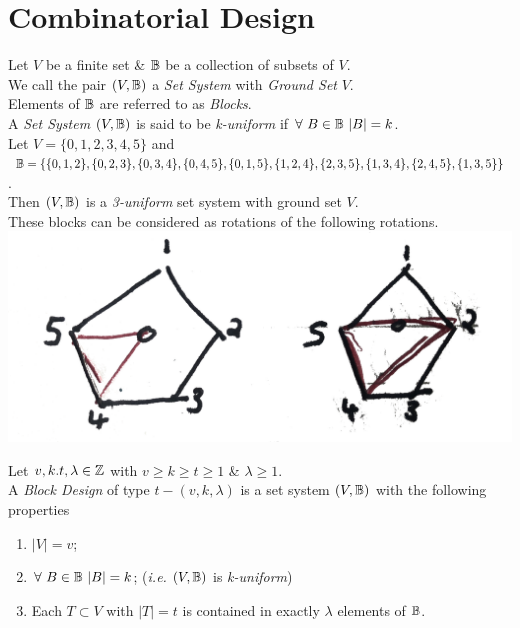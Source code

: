 \documentclass[11pt,a4paper]{article}
\begin{document}
\section{Combinatorial Design}

Let $V$ be a finite set \& $\mathbb{B}$ be a collection of subsets of $V$.\\
We call the pair $(V,\mathbb{B})$ a \textit{Set System} with \textit{Ground Set} $V$.\\
\nb Elements of $\mathbb{B}$ are referred to as \textit{Blocks}.\\

A \textit{Set System} $(V,\mathbb{B})$ is said to be \textit{k-uniform} if $\forall\ B\in\blocks\ |B|=k$.\\

Let $V=\{0,1,2,3,4,5\}$ and\\
$\mathbb{B}=\{\{0,1,2\},\{0,2,3\},\{0,3,4\},\{0,4,5\},\{0,1,5\},\{1,2,4\},\{2,3,5\},\{1,3,4\},\{2,4,5\},\{1,3,5\}\}$.\\
Then $(V,\mathbb{B})$ is a \textit{3-uniform} set system with ground set $V$.\\
These blocks can be considered as rotations of the following rotations.\\
\includegraphics[scale=1]{img/3Uniform.jpg}

Let $v,k.t,\lambda\in\mathbb{Z}$ with $v\geq k\geq t\geq 1$ \& $\lambda\geq1$.\\
A \textit{Block Design} of type $t-(v,k,\lambda)$ is a set system $(V,\mathbb{B})$ with the following properties
\begin{enumerate}[label=\roman*)]
	\item $|V|=v$;
	\item $\forall\ B\in\blocks\ |B|=k$; (\textit{i.e.} $(V,\mathbb{B})$ is \textit{k-uniform})
	\item Each $T\subset V$ with $|T|=t$ is contained in exactly $\lambda$ elements of $\mathbb{B}$.
\end{enumerate}
\end{document}
